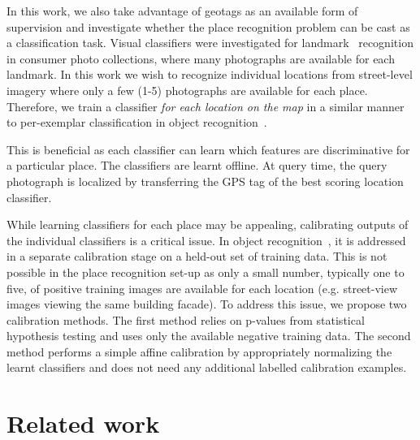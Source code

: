   In this work, we also take advantage of geotags as an available form of supervision and investigate whether the place recognition problem can be cast as a classification task.
  Visual classifiers were investigated for landmark~\cite{Li09} recognition in consumer photo collections, where many photographs are available for each landmark.
  In this work we wish to recognize individual locations from street-level imagery where only a few (1-5) photographs are available for each place. 
  Therefore, we train a classifier {\em for each location on the map} in a similar manner to per-exemplar classification in object recognition~\cite{Malisiewicz11}. 

  This is beneficial as  each classifier can learn which features are discriminative for a particular place. %
   The classifiers are learnt offline. At query time, the query photograph is localized by transferring the GPS tag of the best scoring location classifier.

  While learning classifiers for each place may be appealing, calibrating outputs of the individual classifiers is a critical issue. In object recognition~\cite{Malisiewicz11}, it is addressed in a separate calibration stage on a held-out set of training data.
  This is not possible in the place recognition set-up as only a small number, typically one to five, of positive training images are available for each location (e.g. street-view images viewing the same building facade). To address this issue, we propose two calibration methods. 
  The first method relies on p-values from statistical hypothesis testing and uses only the available negative training data. The second method performs a simple affine calibration by appropriately normalizing the learnt classifiers and does not need any additional labelled calibration examples.   


\section{Related work} 
\label{sec:related}

